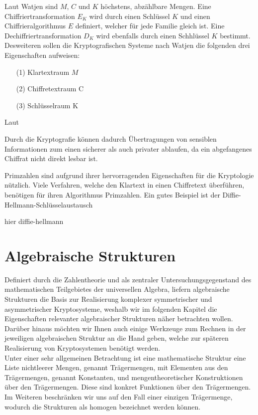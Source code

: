 Laut Watjen sind $M$, $C$ und $K$ höchstens, abzählbare Mengen. Eine Chiffriertransformation $E_K$ wird durch einen Schlüssel $K$ und einen Chiffrieralgorithmus $E$ definiert, welcher für jede Familie gleich ist. Eine Dechiffriertransformation $D_K$ wird ebenfalls durch einen Schhlüssel $K$ bestimmt. Desweiteren sollen die Kryptografischen Systeme nach Watjen die folgenden drei Eigenschaften aufweisen:

\begin{itemize}
\item[ (1) ]  Klartextraum $M$
\item[ (2) ]  Chiffretextraum C
\item[ (3) ]  Schlüsselraum K
\end{itemize}

Laut



Durch die Kryptografie können dadurch Übertragungen von sensiblen Informationen zum einen sicherer als auch privater ablaufen, da ein abgefangenes Chiffrat nicht direkt lesbar ist. 






Primzahlen sind aufgrund ihrer hervorragenden Eigenschaften für die Kryptologie nützlich. Viele Verfahren, welche den Klartext in einen Chiffretext überführen, benötigen für ihren Algorithmus Primzahlen. Ein gutes Beispiel ist der Diffie-Hellmann-Schlüsselaustausch 

hier diffie-hellmann




\section{Algebraische Strukturen}
Definiert durch die Zahlentheorie und als zentraler Untersuchungsgegenstand des mathematischen Teilgebietes der universellen Algebra, liefern algebraische Strukturen die Basis zur Realisierung komplexer symmetrischer und asymmetrischer Kryptosysteme, weshalb wir im folgenden Kapitel die Eigenschaften relevanter algebraischer Strukturen näher betrachten wollen. Darüber hinaus möchten wir Ihnen auch einige Werkzeuge zum Rechnen in der jeweiligen algebraischen Struktur an die Hand geben, welche zur späteren Realisierung von Kryptosystemen benötigt werden.\\

Unter einer sehr allgemeinen Betrachtung ist eine mathematische Struktur eine Liste nichtleerer Mengen, genannt Trägermengen, mit Elementen aus den Trägermengen, genannt Konstanten, und mengentheoretischer Konstruktionen über den Trägermengen. Diese sind konkret Funktionen über den Trägermengen. Im Weiteren beschränken wir uns auf den Fall einer einzigen Trägermenge, wodurch die Strukturen als homogen bezeichnet werden können.

